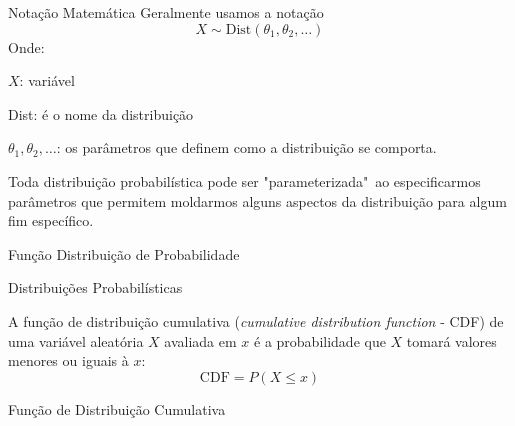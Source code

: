 \begin{frame}{Notação Matemática}
	Geralmente usamos a notação
	$$X \sim \text{Dist}(\theta_1, \theta_2, \dots)$$
	Onde:
	\begin{vfilleditems}
		\item $X$: variável
		\item Dist: é o nome da distribuição
		\item $\theta_1, \theta_2, \dots$: os parâmetros que definem como a distribuição se comporta.
	\end{vfilleditems}
	Toda distribuição probabilística pode ser "parameterizada"~ao especificarmos parâmetros que permitem moldarmos alguns aspectos da distribuição para algum fim específico.
\end{frame}

\begin{frame}{Função Distribuição de Probabilidade}
	\centering
\end{frame}

\begin{frame}{Distribuições Probabilísticas}
	\begin{defn}
		A função de distribuição cumulativa (\textit{cumulative distribution function} - CDF)
		de uma variável aleatória $X$ avaliada em $x$ é a probabilidade que $X$ tomará
		valores menores ou iguais à $x$:
		$$\text{CDF} = P(X \leq x)$$
	\end{defn}
\end{frame}

\begin{frame}{Função de Distribuição Cumulativa}
	\centering
\end{frame}

